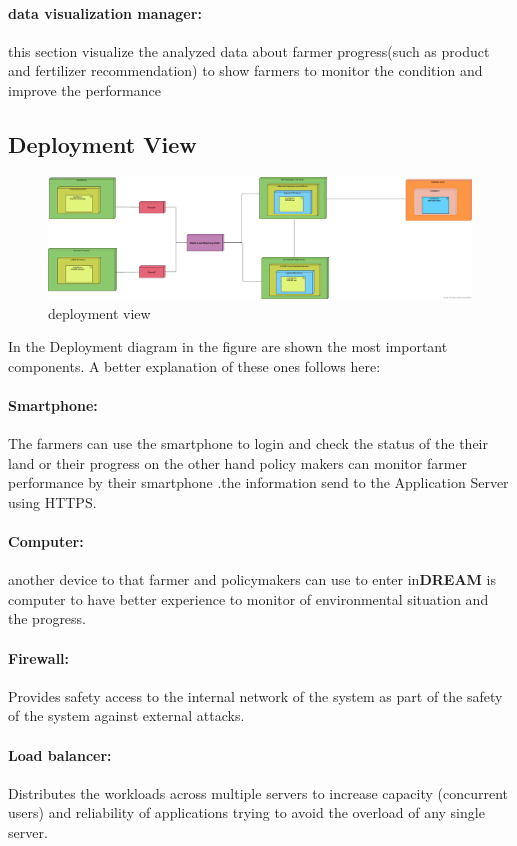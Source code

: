 \paragraph{data visualization manager:}this section visualize the analyzed data about farmer progress(such as product and fertilizer recommendation) to show farmers to monitor the condition and improve the performance  
\subsection{Deployment View}
\begin{figure}[H]
\includegraphics[width=1\textwidth]{figures/deploymentView.png}
\caption{\label{fig:student } deployment view }
\end{figure}
In the Deployment diagram in the figure are shown the most important components. A better explanation of these ones follows here:\\
\paragraph{Smartphone:} The farmers can use the smartphone to login and check the status of the their land or their progress on the other hand policy makers can monitor farmer performance by their smartphone .the information send  to the Application Server using HTTPS.
\paragraph{Computer:} another device to that farmer and policymakers can use to enter in\textbf{DREAM} is computer to have better experience to monitor of environmental situation and the progress.
\paragraph{Firewall:} Provides safety access to the internal network of the system as part of the safety of the system against external attacks.
\paragraph{Load balancer:} Distributes the workloads across multiple servers to increase capacity (concurrent
users) and reliability of applications trying to avoid the overload of any single server.
